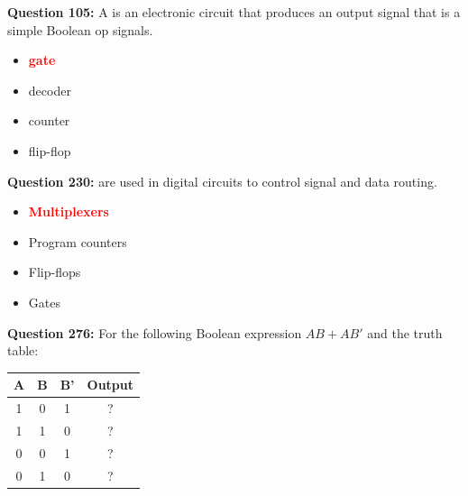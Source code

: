 \documentclass[12pt,a4paper]{article}
\begin{document}
\vspace{0.5cm}

\vspace{0.5cm}

\textbf{Question 105:} A \underline{\hspace{1.5cm}} is an electronic circuit that produces an output signal that is a simple Boolean op signals.

\begin{itemize}
    \item[\textbf{A.}] \textcolor{red}{\textbf{gate}}
    \item[\textbf{B.}] decoder
    \item[\textbf{C.}] counter
    \item[\textbf{D.}] flip-flop
\end{itemize}

\vspace{0.5cm}

\vspace{0.5cm}

\vspace{0.5cm}

\vspace{0.5cm}

\textbf{Question 230:} \underline{\hspace{1.5cm}} are used in digital circuits to control signal and data routing.

\begin{itemize}
    \item[\textbf{A.}] \textcolor{red}{\textbf{Multiplexers}}
    \item[\textbf{B.}] Program counters
    \item[\textbf{C.}] Flip-flops
    \item[\textbf{D.}] Gates
\end{itemize}

\vspace{0.5cm}

\vspace{0.5cm}

\textbf{Question 276:} For the following Boolean expression $AB + AB'$ and the truth table:

\begin{center}
\renewcommand{\arraystretch}{1.3}
\begin{tabular}{|c|c|c|c|}
\hline
\textbf{A} & \textbf{B} & \textbf{B'} & \textbf{Output} \\ \hline
1 & 0 & 1 & ? \\ \hline
1 & 1 & 0 & ? \\ \hline
0 & 0 & 1 & ? \\ \hline
0 & 1 & 0 & ? \\ \hline
\end{tabular}
\end{center}
\end{document}
